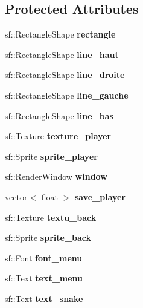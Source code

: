 \subsection*{Protected Attributes}
\begin{DoxyCompactItemize}
\item 
\mbox{\label{classlib___s_f_m_l_acafec6ffbb2e611589c86984b5eed1bd}} 
sf\+::\+Rectangle\+Shape {\bfseries rectangle}
\item 
\mbox{\label{classlib___s_f_m_l_aad136da1b888c789b561be0c643e9165}} 
sf\+::\+Rectangle\+Shape {\bfseries line\+\_\+haut}
\item 
\mbox{\label{classlib___s_f_m_l_a65f596bcc1c07ac5b271e21e09609845}} 
sf\+::\+Rectangle\+Shape {\bfseries line\+\_\+droite}
\item 
\mbox{\label{classlib___s_f_m_l_a4ea65c78097fa73046d2b3a322cc5045}} 
sf\+::\+Rectangle\+Shape {\bfseries line\+\_\+gauche}
\item 
\mbox{\label{classlib___s_f_m_l_a799f84863c9ef05c6f620530088bbfdc}} 
sf\+::\+Rectangle\+Shape {\bfseries line\+\_\+bas}
\item 
\mbox{\label{classlib___s_f_m_l_a5d6b2cd8879e0dda20dea1341d7d2550}} 
sf\+::\+Texture {\bfseries texture\+\_\+player}
\item 
\mbox{\label{classlib___s_f_m_l_a6bb9e3f74b68de7512388ec33356829c}} 
sf\+::\+Sprite {\bfseries sprite\+\_\+player}
\item 
\mbox{\label{classlib___s_f_m_l_a961c979490e59236ef1fd7ae7064ce10}} 
sf\+::\+Render\+Window {\bfseries window}
\item 
\mbox{\label{classlib___s_f_m_l_ad58b75107373a0be34ba08880ccfb65f}} 
vector$<$ float $>$ {\bfseries save\+\_\+player}
\item 
\mbox{\label{classlib___s_f_m_l_abd39e8150e6ab622abc624aadfab3111}} 
sf\+::\+Texture {\bfseries textu\+\_\+back}
\item 
\mbox{\label{classlib___s_f_m_l_a5ba69bf2a680ca2ac61098cd8a8372e6}} 
sf\+::\+Sprite {\bfseries sprite\+\_\+back}
\item 
\mbox{\label{classlib___s_f_m_l_a3992dadf817d4f71f0edf8a16f9ff8a9}} 
sf\+::\+Font {\bfseries font\+\_\+menu}
\item 
\mbox{\label{classlib___s_f_m_l_affa7ca82c3ec4a531d8059011febbb86}} 
sf\+::\+Text {\bfseries text\+\_\+menu}
\item 
\mbox{\label{classlib___s_f_m_l_afab51dda4a7193ec1ba6d8769d28a65d}} 
sf\+::\+Text {\bfseries text\+\_\+snake}
\item 
\mbox{\label{classlib___s_f_m_l_af66b3764239afeb27c6c0a9c6eacb989}} 

\end{DoxyCompactItemize}
